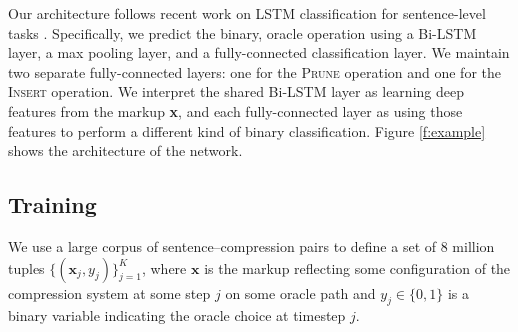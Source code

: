 \documentclass[11pt,a4paper]{article}
\begin{document}
Our architecture follows recent work on LSTM classification for sentence-level tasks \cite{D17-1070}. Specifically, we predict the binary, oracle operation using a Bi-LSTM layer, a max pooling layer, and a fully-connected classification layer. We maintain two separate fully-connected layers: one for the \textsc{Prune} operation and one for the \textsc{Insert} operation. We interpret the shared Bi-LSTM layer as learning deep features from the markup \textbf{x}, and each fully-connected layer as using those features to perform a different kind of binary classification. Figure \ref{f:example} shows the architecture of the network. 







\subsection{Training}

We use a large corpus of sentence--compression pairs \cite{filippova2013overcoming} to define a set of 8 million tuples $\{(\bm{x}_j, y_j) \}_{j=1}^{K}$, where $\bm{x}$ is the markup reflecting some configuration of the compression system at some step $j$ on some oracle path and $y_j \in \{0,1\}$ is a binary variable indicating the oracle choice at timestep $j$. 
\end{document}
